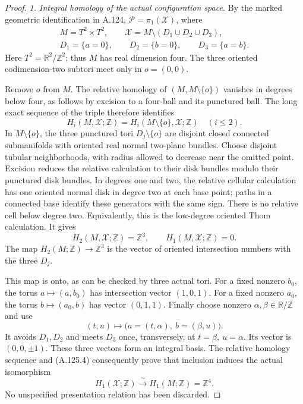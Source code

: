 \begin{proof}
\emph{1. Integral homology of the actual configuration space.}
By the marked geometric identification in A.124,
\(\mathcal P=\pi_1(\mathcal X)\), where
\[
 \begin{gathered}
 M=T^2\times T^2,\qquad
 \mathcal X=M\setminus(D_1\cup D_2\cup D_3),\\
 D_1=\{a=0\},\qquad D_2=\{b=0\},\qquad D_3=\{a=b\}.
 \end{gathered}
\]
Here \(T^2=\mathbb R^2/\mathbb Z^2\); thus \(M\) has real
dimension four. The three oriented codimension-two subtori
meet only in \(o=(0,0)\).

Remove \(o\) from \(M\). The relative homology of
\((M,M\setminus\{o\})\) vanishes in degrees below four,
as follows by excision to a four-ball and its punctured ball.
The long exact sequence of the triple therefore identifies
\[
 H_i(M,\mathcal X;\mathbb Z)
 =H_i(M\setminus\{o\},\mathcal X;\mathbb Z)
 \quad (i\leq2).
\]
In \(M\setminus\{o\}\), the three punctured tori
\(D_j\setminus\{o\}\) are disjoint closed connected submanifolds
with oriented real normal two-plane bundles. Choose disjoint
tubular neighborhoods, with radius allowed to decrease near
the omitted point. Excision reduces the relative calculation
to their disk bundles modulo their punctured disk bundles.
In degrees one and two, the relative cellular calculation has
one oriented normal disk in degree two at each base point;
paths in a connected base identify these generators with the
same sign. There is no relative cell below degree two.
Equivalently, this is the low-degree oriented Thom calculation.
It gives
\[
 H_2(M,\mathcal X;\mathbb Z)=\mathbb Z^3,\qquad
 H_1(M,\mathcal X;\mathbb Z)=0.                               \tag{A.125.4}
\]
The map \(H_2(M;\mathbb Z)\to\mathbb Z^3\) is the vector
of oriented intersection numbers with the three \(D_j\).

This map is onto, as can be checked by three actual tori.
For a fixed nonzero \(b_0\), the torus \(a\mapsto(a,b_0)\)
has intersection vector \((1,0,1)\).
For a fixed nonzero \(a_0\), the torus \(b\mapsto(a_0,b)\)
has vector \((0,1,1)\).
Finally choose nonzero \(\alpha,\beta\in\mathbb R/\mathbb Z\)
and use
\[
 (t,u)\longmapsto
       \bigl(a=(t,\alpha),\ b=(\beta,u)\bigr).
\]
It avoids \(D_1,D_2\) and meets \(D_3\) once, transversely,
at \(t=\beta,\ u=\alpha\). Its vector is \((0,0,\pm1)\).
These three vectors form an integral basis. The relative
homology sequence and (A.125.4) consequently prove that
inclusion induces the actual isomorphism
\[
 H_1(\mathcal X;\mathbb Z)\xrightarrow{\ \sim\ }
 H_1(M;\mathbb Z)=\mathbb Z^4.                               \tag{A.125.5}
\]
No unspecified presentation relation has been discarded.


\end{proof}
